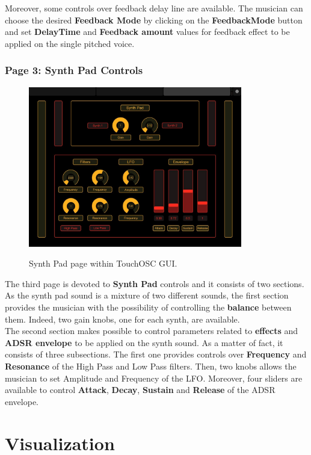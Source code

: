 \documentclass{article}
\begin{document}
Moreover, some controls over feedback delay line are available. The musician can choose the desired \textbf{Feedback Mode} by clicking on the \textbf{FeedbackMode} button and set \textbf{DelayTime} and \textbf{Feedback amount} values for feedback effect to be applied on the single pitched voice.

\subsubsection{Page 3: Synth Pad Controls}

\begin{figure}
{\includegraphics[width=9.35cm]{SynthPadControls-TouchOSC-GUI.png}}\par
    \caption{Synth Pad page within TouchOSC GUI.}
\end{figure}

The third page is devoted to \textbf{Synth Pad} controls and it consists of two sections.
As the synth pad sound is a mixture of two different sounds, the first section provides the musician with the possibility of controlling the \textbf{balance} between them. Indeed, two gain knobs, one for each synth, are available. \\

The second section makes possible to control parameters related to \textbf{effects} and \textbf{ADSR envelope} to be applied on the synth sound. As a matter of fact, it consists of three subsections. The first one provides controls over \textbf{Frequency} and \textbf{Resonance} of the High Pass and Low Pass filters. Then, two knobs allows the musician to set Amplitude and Frequency of the LFO. Moreover, four sliders are available to control \textbf{Attack}, \textbf{Decay}, \textbf{Sustain} and \textbf{Release} of the ADSR envelope.


\section{Visualization}
\end{document}
